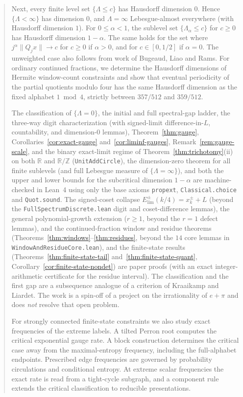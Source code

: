 \documentclass[11pt]{article}
\theoremstyle{definition}
\theoremstyle{remark}
\newcommand{\R}{\mathbb{R}}
\newcommand{\Z}{\mathbb{Z}}
\newcommand{\Lam}{\Lambda}
\begin{document}
\begin{abstract}
Next, every finite level set $\{\Lam\le c\}$ has Hausdorff dimension $0$.
Hence $\{\Lam<\infty\}$ has dimension $0$, and $\Lam=\infty$ Lebesgue-almost
everywhere (with Hausdorff dimension $1$). For $0\le\alpha<1$, the sublevel set $\{\Lam_\alpha\le c\}$ for $c\ge0$
has Hausdorff dimension $1-\alpha$. The same holds for the set where
$j^\alpha\|Q_jx\|\to c$ for $c\ge0$ if $\alpha>0$, and for
$c\in[0,1/2]$ if $\alpha=0$. The unweighted case also follows from work
of Bugeaud, Liao and Rams. For ordinary continued fractions,
we determine the Hausdorff dimensions of Hermite window-count constraints and
show that eventual periodicity of the partial quotients modulo four has the same
Hausdorff dimension as the fixed alphabet $1\bmod 4$, strictly between $357/512$
and $359/512$.

The classification of $\{\Lam=0\}$, the initial and full spectral-gap ladder,
the three-way digit characterization (with signed-limit difference-in-$L$,
countability, and dimension-$0$ lemmas), Theorem~\ref{thm:gauge},
Corollaries~\ref{cor:exact-gauge} and~\ref{cor:liminf-gauges},
Remark~\ref{rem:gauge-scale}, and the binary
exact-limit regime of Theorem~\ref{thm:trichotomy}(ii) on both $\R$ and $\R/\Z$
(\texttt{UnitAddCircle}), the dimension-zero theorem for all finite sublevels
(and full Lebesgue measure of $\{\Lam=\infty\}$), and both the upper and lower
bounds for the subcritical dimension $1-\alpha$ are machine-checked in Lean~4
using only the base axioms \texttt{propext}, \texttt{Classical.choice} and
\texttt{Quot.sound}. The signed-coset collapse
$E_{\mathrm{lim}}^\pm(k/4)=x_k^\pm+L$ (beyond the
\texttt{FullSpectrumDiscrete.lean} digit and coset-difference lemmas), the
general polynomial-growth extension ($r\ge1$, beyond the $r=1$ defect lemmas),
and the continued-fraction window and residue theorems
(Theorems~\ref{thm:windows}--\ref{thm:residues}, beyond the $14$ core lemmas in
\texttt{WindowAndResidueCore.lean}), and the finite-state results
(Theorems~\ref{thm:finite-state-tail} and~\ref{thm:finite-state-quant},
Corollary~\ref{cor:finite-state-nondet}) are paper proofs (with an exact
integer-arithmetic certificate for the residue interval). The classification and
the first gap are a subsequence analogue of a criterion of Kraaikamp and
Liardet. The work is a spin-off of a project on the irrationality of $e+\pi$ and
does \emph{not} resolve that open problem.

For strongly connected finite-state constraints we also study exact
frequencies of the extreme labels. A tilted Perron root computes
the critical exponential gauge rate. A block construction determines
the critical case away from the maximal-entropy frequency, including
the full-alphabet endpoints.
Prescribed edge frequencies are governed by probability circulations
and conditional entropy. At extreme scalar frequencies the exact
rate is read from a tight-cycle subgraph, and a component rule
extends the critical classification to reducible presentations.
\end{abstract}
\end{document}
